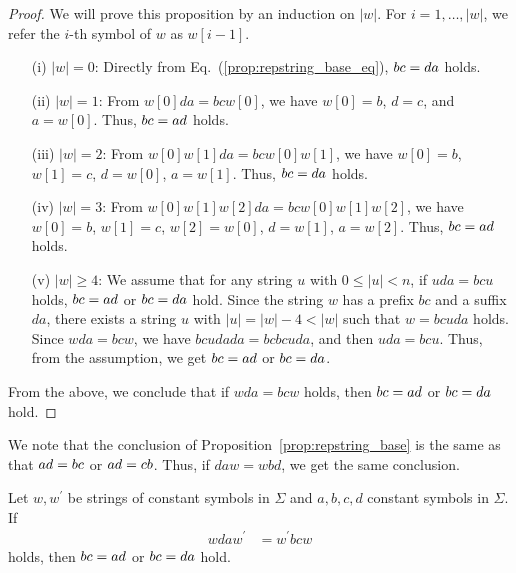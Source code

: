 \begin{proof}
  We will prove this proposition by an induction on $|w|$.
  For $i=1,\ldots,|w|$, we refer the $i$-th symbol of $w$ as $w[i - 1]$. 
  \begin{enumerate}
  \item[(i)] $|w| = 0$: Directly from Eq.~(\ref{prop:repstring_base_eq}), $bc = da$ holds.
  \item[(ii)] $|w| = 1$: From $w[0]da = bcw[0]$, we have $w[0] = b$, $d = c$, and $a = w[0]$. Thus, $bc = ad$ holds.
  \item[(iii)] $|w| = 2$: From $w[0]w[1]da = bcw[0]w[1]$, we have $w[0] = b$, $w[1] = c$, $d = w[0]$, $a = w[1]$. Thus, $bc = da$ holds.
  \item[(iv)] $|w| = 3$: From $w[0]w[1]w[2]da = bcw[0]w[1]w[2]$, we have $w[0] = b$, $w[1] = c$, $w[2] = w[0]$, $d = w[1]$, $a = w[2]$. Thus, $bc = ad$ holds.
  \item[(v)] $|w| \ge 4$: We assume that for any string $u$ with $0\leq |u| < n$, if $uda = bcu$ holds, $bc = ad$ or $bc = da$ hold. Since the string $w$ has a prefix $bc$ and a suffix $da$, there exists a string $u$ with $|u| = |w| - 4 < |w|$ such that $w = bcuda$ holds. Since $wda = bcw$, we have $bcudada = bcbcuda$, and then $uda = bcu$. Thus, from the assumption, we get $bc = ad$ or $bc = da$.
  \end{enumerate}
From the above, we conclude that if $wda = bcw$ holds, then $bc = ad$ or $bc = da$ hold.
\end{proof}

We note that the conclusion of Proposition~\ref{prop:repstring_base} is the same as that $ad = bc$ or $ad = cb$. Thus, if $daw = wbd$, we get the same conclusion. 

\begin{prop}\label{prop:repstring}
Let $w,w^{\prime}$ be strings of constant symbols in $\Sigma$ and $a,b,c,d$ constant symbols in $\Sigma$.
If
\begin{align}
  wdaw^{\prime} & = w^{\prime}bcw
\end{align}
holds, then $bc = ad$ or $bc = da$ hold.\label{prop:repstring_eq}
\end{prop}

